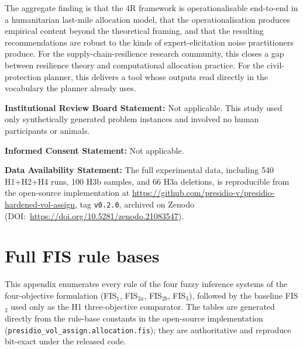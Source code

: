 \documentclass[applsci,article,submit,moreauthors,pdftex]{Definitions/mdpi}
\providecommand{\dataavailability}[1]{\vspace{6pt}\noindent\textbf{Data Availability Statement:} #1\par}
\providecommand{\institutionalreview}[1]{\vspace{6pt}\noindent\textbf{Institutional Review Board Statement:} #1\par}
\providecommand{\informedconsent}[1]{\vspace{6pt}\noindent\textbf{Informed Consent Statement:} #1\par}
\begin{document}
The aggregate finding is that the 4R framework is operationalisable
end-to-end in a humanitarian last-mile allocation model, that the
operationalisation produces empirical content beyond the theoretical
framing, and that the resulting recommendations are robust to the kinds
of expert-elicitation noise practitioners produce. For the
supply-chain-resilience research community, this closes a gap between
resilience theory and computational allocation practice. For the
civil-protection planner, this delivers a tool whose outputs read
directly in the vocabulary the planner already uses.



\institutionalreview{Not applicable. This study used only synthetically generated problem instances
and involved no human participants or animals.}

\informedconsent{Not applicable.}

\dataavailability{The full experimental data, including 540 H1+H2+H4 runs, 100 H3b samples,
and 66 H3a deletions, is reproducible from the open-source implementation
at \url{https://github.com/presidio-v/presidio-hardened-vol-assign}, tag
\texttt{v0.2.0}, archived on Zenodo (DOI:~\url{https://doi.org/10.5281/zenodo.21083547}).}



\appendix
\section{Full FIS rule bases}\label{app:rules}

This appendix enumerates every rule of the four fuzzy inference systems of the
four-objective formulation (FIS$_1$, FIS$_{2a}$, FIS$_{2b}$, FIS$_3$), followed
by the baseline FIS$_2$ used only as the H1 three-objective comparator. The
tables are generated directly from the rule-base constants in the open-source
implementation (\texttt{presidio\_vol\_assign.allocation.fis}); they are
authoritative and reproduce bit-exact under the released code.
\end{document}
